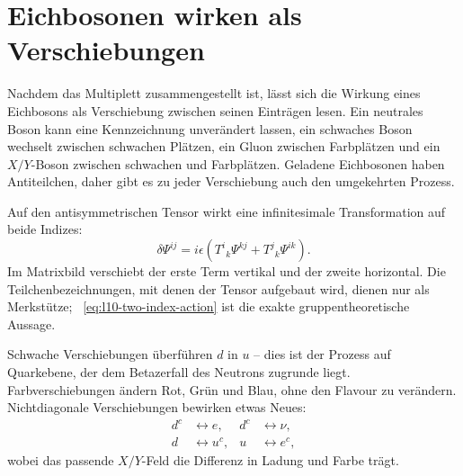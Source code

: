 \section{Eichbosonen wirken als Verschiebungen}

Nachdem das Multiplett zusammengestellt ist, lässt sich die Wirkung eines Eichbosons als Verschiebung zwischen seinen Einträgen lesen. Ein neutrales Boson kann eine Kennzeichnung unverändert lassen, ein schwaches Boson wechselt zwischen schwachen Plätzen, ein Gluon zwischen Farbplätzen und ein \(X/Y\)-Boson zwischen schwachen und Farbplätzen. Geladene Eichbosonen haben Antiteilchen, daher gibt es zu jeder Verschiebung auch den umgekehrten Prozess.

Auf den antisymmetrischen Tensor wirkt eine infinitesimale Transformation auf beide Indizes:
\begin{equation}
\delta\Psi^{ij}
=
i\epsilon
\left(
T^i{}_k\Psi^{kj}
+
T^j{}_k\Psi^{ik}
\right).
\label{eq:l10-two-index-action}
\end{equation}
Im Matrixbild verschiebt der erste Term vertikal und der zweite horizontal. Die Teilchenbezeichnungen, mit denen der Tensor aufgebaut wird, dienen nur als Merkstütze; ~\eqref{eq:l10-two-index-action} ist die exakte gruppentheoretische Aussage.

Schwache Verschiebungen überführen \(d\) in \(u\) – dies ist der Prozess auf Quarkebene, der dem Betazerfall des Neutrons zugrunde liegt. Farbverschiebungen ändern Rot, Grün und Blau, ohne den Flavour zu verändern. Nichtdiagonale Verschiebungen bewirken etwas Neues:
\begin{equation}
\begin{aligned}
d^c&\longleftrightarrow e,
& d^c&\longleftrightarrow\nu,\\
d&\longleftrightarrow u^c,
& u&\longleftrightarrow e^c,
\end{aligned}
\label{eq:l10-leptoquark-shifts}
\end{equation}
wobei das passende \(X/Y\)-Feld die Differenz in Ladung und Farbe trägt.

\begin{classroomqa}
\end{classroomqa}

